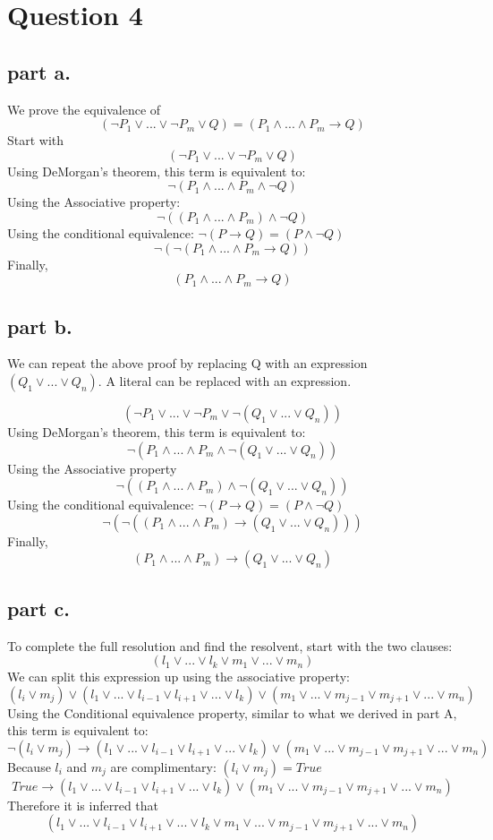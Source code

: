 \section{Question 4}

\subsection{part a.}
We prove the equivalence of  \[
(\neg P_1 \lor ... \lor \neg P_m \lor Q) = (P_1 \land ... \land P_m \to Q)
\]
Start with
\[
(\neg P_1 \lor ... \lor \neg P_m \lor Q)
\]
Using DeMorgan's theorem, this term is equivalent to: 
\[
\neg(P_1 \land ... \land P_m \land \neg Q)
\]
Using the Associative property:
\[
\neg((P_1 \land ... \land P_m) \land \neg Q)
\]
Using the conditional equivalence: $\neg(P \to Q) = (P \land \neg Q)$
\[
\neg(\neg(P_1 \land ... \land P_m \to Q))
\]
Finally,
\[
(P_1 \land ... \land P_m \to Q)
\]

\subsection{part b.}
We can repeat the above proof by replacing Q with an expression $(Q_1 \lor ... \lor Q_n)$. A literal can be replaced with an expression. 

\[
(\neg P_1 \lor ... \lor \neg P_m \lor \neg (Q_1 \lor ... \lor Q_n))
\]
Using DeMorgan's theorem, this term is equivalent to:
\[
\neg(P_1 \land ... \land P_m \land \neg (Q_1 \lor ... \lor Q_n))
\]
Using the Associative property
\[
\neg((P_1 \land ... \land P_m) \land \neg (Q_1 \lor ... \lor Q_n))
\]
Using the conditional equivalence: $\neg(P \to Q) = (P \land \neg Q)$
\[
\neg(\neg((P_1 \land ... \land P_m) \to (Q_1 \lor ... \lor Q_n)))
\]
Finally,
\[
(P_1 \land ... \land P_m) \to (Q_1 \lor ... \lor Q_n)
\]

\subsection{part c.}
To complete the full resolution and find the resolvent, start with the two clauses:
\[
(l_1 \lor ... \lor l_k \lor m_1 \lor ... \lor m_n)
\]
We can split this expression up using the associative property:
\[
(l_i \lor m_j) \lor (l_1 \lor ... \lor l_{i-1} \lor l_{i+1} \lor ... \lor l_k) \lor (m_1 \lor ... \lor m_{j-1} \lor m_{j+1} \lor ...  \lor m_n)  
\]
Using the Conditional equivalence property, similar to what we derived in part A, this term is equivalent to:
\[
\neg(l_i \lor m_j) \to (l_1 \lor ... \lor l_{i-1} \lor l_{i+1} \lor ... \lor l_k) \lor (m_1 \lor ... \lor m_{j-1} \lor m_{j+1} \lor ...  \lor m_n)  
\]
Because $l_i$ and $m_j$ are complimentary:
$(l_i \lor m_j) = True$
\[
True \to (l_1 \lor ... \lor l_{i-1} \lor l_{i+1} \lor ... \lor l_k) \lor (m_1 \lor ... \lor m_{j-1} \lor m_{j+1} \lor ...  \lor m_n)  
\]
Therefore it is inferred that  
\[
(l_1 \lor ... \lor l_{i-1} \lor l_{i+1} \lor ... \lor l_k \lor m_1 \lor ... \lor m_{j-1} \lor m_{j+1} \lor ...  \lor m_n)
\]